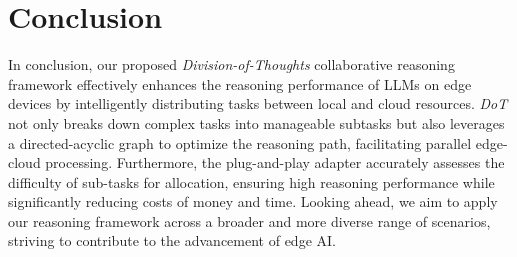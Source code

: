 \vspace{-2mm}

\section{Conclusion}

In conclusion, our proposed \textit{Division-of-Thoughts} collaborative reasoning framework effectively enhances the reasoning performance of LLMs on edge devices by intelligently distributing tasks between local and cloud resources. \textit{DoT} not only breaks down complex tasks into manageable subtasks but also leverages a directed-acyclic graph to optimize the reasoning path, facilitating parallel edge-cloud processing. Furthermore, the plug-and-play adapter accurately assesses the difficulty of sub-tasks for allocation, ensuring high reasoning performance while significantly reducing costs of money and time.
Looking ahead, we aim to apply our reasoning framework across a broader and more diverse range of scenarios, striving to contribute to the advancement of edge AI.



